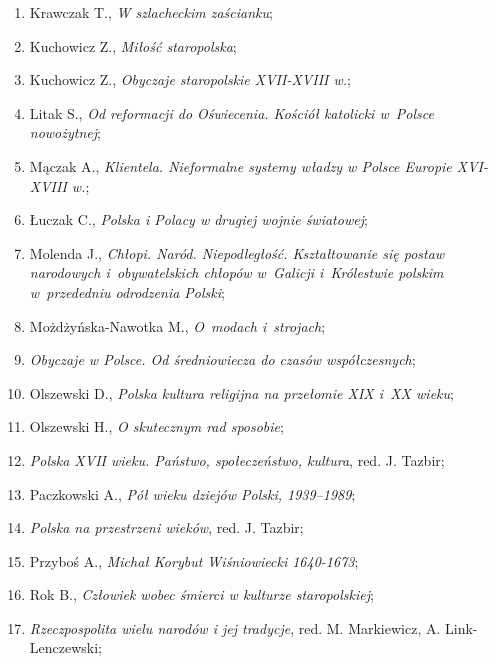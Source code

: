 \documentclass[a4paper,11pt]{article}
\begin{document}
\begin{enumerate}
\item Krawczak T., \emph{W szlacheckim zaścianku};

\item Kuchowicz Z., \emph{Miłość staropolska};

\item Kuchowicz Z., \emph{Obyczaje staropolskie XVII-XVIII w.};

\item Litak S., \emph{Od reformacji do Oświecenia. Kościół katolicki
    w~Polsce nowożytnej};

\item Mączak A., \emph{Klientela. Nieformalne systemy władzy w Polsce
    Europie XVI-XVIII w.};

\item Łuczak C., \emph{Polska i Polacy w drugiej wojnie światowej};

\item Molenda J., \emph{Chłopi. Naród. Niepodległość. Kształtowanie
    się postaw narodowych i~obywatelskich chłopów w~Galicji
    i~Królestwie polskim w~przededniu odrodzenia Polski};

\item Możdżyńska-Nawotka M., \emph{O~modach i~strojach};

\item \emph{Obyczaje w Polsce. Od średniowiecza do czasów
    współczesnych};

\item Olszewski D., \emph{Polska kultura religijna na przełomie XIX
    i~XX wieku};

\item Olszewski H., \emph{O skutecznym rad sposobie};

\item \emph{Polska XVII wieku. Państwo, społeczeństwo, kultura}, red.
  J. Tazbir;

\item Paczkowski A., \emph{Pół wieku dziejów Polski, 1939--1989};

\item \emph{Polska na przestrzeni wieków}, red. J. Tazbir;

\item Przyboś A., \emph{Michał Korybut Wiśniowiecki 1640-1673};

\item Rok B., \emph{Człowiek wobec śmierci w kulturze staropolskiej};

\item \emph{Rzeczpospolita wielu narodów i jej tradycje}, red. M.
  Markiewicz, A. Link-Lenczewski;


\end{enumerate}
\end{document}
